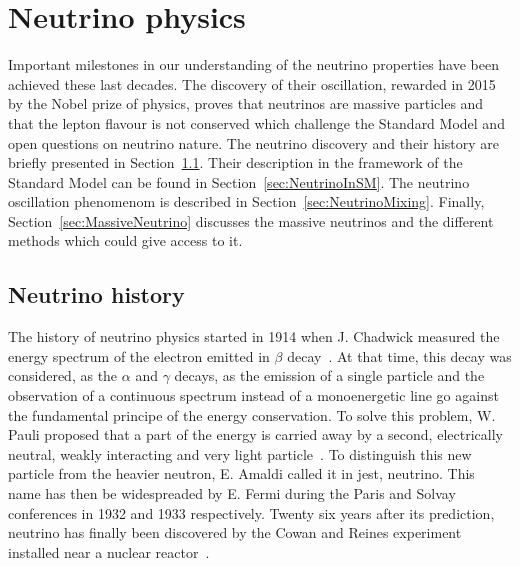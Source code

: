 \documentclass[main.tex]{subfiles}
\begin{document}
\chapter{Neutrino physics}





\NI Important milestones in our understanding of the neutrino properties have been achieved these last decades. The discovery of their oscillation, rewarded in 2015 by the Nobel prize of physics, proves that neutrinos are massive particles and that the lepton flavour is not conserved which challenge the Standard Model and open questions on neutrino nature. The neutrino discovery and their history are briefly presented in Section~\ref{sec:NeutrinoHistory}. Their description in the framework of the Standard Model can be found in Section~\ref{sec:NeutrinoInSM}. The neutrino oscillation phenomenom is described in Section~\ref{sec:NeutrinoMixing}. Finally, Section~\ref{sec:MassiveNeutrino} discusses the massive neutrinos and the different methods which could give access to it.


\section{Neutrino history}\label{sec:NeutrinoHistory}


\NI The history of neutrino physics started in 1914 when J. Chadwick measured the energy spectrum of the electron emitted in $\beta$ decay~\cite{ChadwickBetaSpectrum}. At that time, this decay was considered, as the $\alpha$ and $\gamma$ decays, as the emission of a single particle and the observation of a continuous spectrum instead of a monoenergetic line go against the fundamental principe of the energy conservation. To solve this problem, W. Pauli proposed that a part of the energy is carried away by a second, electrically neutral, weakly interacting and very light particle~\cite{PauliLetter}. To distinguish this new particle from the heavier neutron, E. Amaldi called it in jest, neutrino. This name has then be widespreaded by E. Fermi during the Paris and Solvay conferences in 1932 and 1933 respectively. Twenty six years after its prediction, neutrino has finally been discovered by the Cowan and Reines experiment installed near a nuclear reactor~\cite{CowanReines}.
\end{document}
